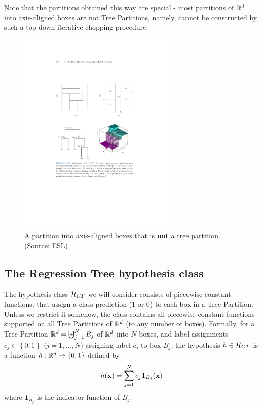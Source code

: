 \begin{itemize}
     Note that the partitions obtained
     this way are special - most partitions of $\mathbb{R}^d$ into axis-aligned
     boxes are not Tree Partitions, namely, cannot be constructed by such a
     top-down iterative chopping procedure. 

      \begin{figure}[h!]
       \centering
       \includegraphics[width=3in]{esl_no_tree.pdf}
       \caption{A partition into axis-aligned boxes that is {\bf not} a tree
       partition. (Source: ESL)}
    
     \end{figure}

    
     \subsection{The Regression Tree hypothesis class}

     The hypothesis class $\mathcal{H}_{CT}$ we will consider consists of piecewise-constant
     functions, that assign a class prediction ($1$ or $0$) to each box in a
     Tree Partition. Unless we restrict it somehow, the class contains all
     piecewise-constant functions supported on all Tree Partitions of $\mathbb{R}^d$
     (to any number of boxes).
     Formally, for a Tree Partition $\mathbb{R}^d=\biguplus_{j=1}^N B_j$ of
     $\mathbb{R}^d$ into $N$ boxes, and label assignments $c_j \in \left\{ 0,1
     \right\}$ ($j=1,\ldots, N$) assigning label $c_j$ to box $B_j$, the
     hypothesis $h\in\mathcal{H}_{CT}$ is a function $h:\mathbb{R}^d\to\left\{ 0,1
     \right\}$ defined by 
     \[
       h(\mathbf{x}) = \sum_{j=1}^N c_j \mathbf{1}_{B_j}(\mathbf{x})
     \]
     where $\mathbf{1}_{B_j}$ is the indicator function of $B_j$. 


\end{itemize}
